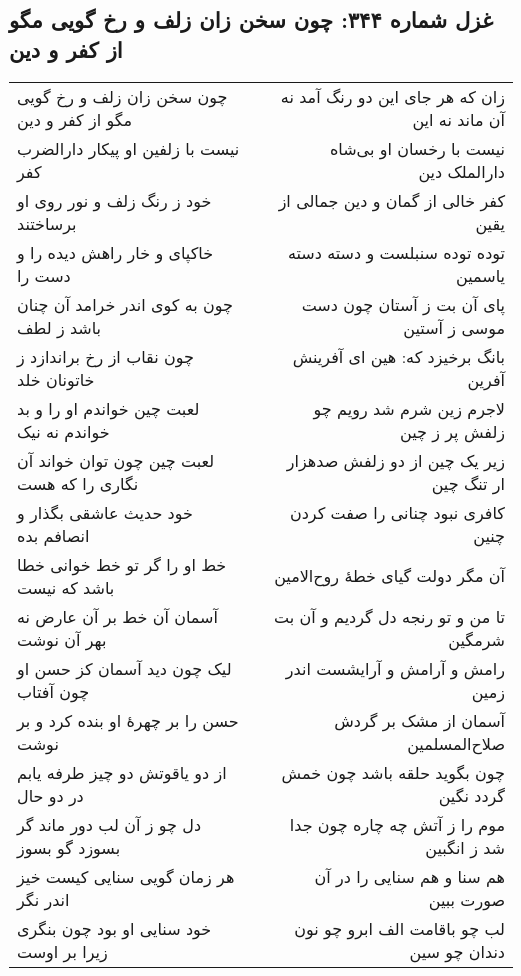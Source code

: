 \begin{center}
\section*{غزل شماره ۳۴۴: چون سخن زان زلف و رخ گویی مگو از کفر و دین}
\label{sec:344}
\begin{longtable}{l p{0.5cm} r}
چون سخن زان زلف و رخ گویی مگو از کفر و دین
&&
زان که هر جای این دو رنگ آمد نه آن ماند نه این
\\
نیست با زلفین او پیکار دارالضرب کفر
&&
نیست با رخسان او بی‌شاه دارالملک دین
\\
خود ز رنگ زلف و نور روی او برساختند
&&
کفر خالی از گمان و دین جمالی از یقین
\\
خاکپای و خار راهش دیده را و دست را
&&
توده توده سنبلست و دسته دسته یاسمین
\\
چون به کوی اندر خرامد آن چنان باشد ز لطف
&&
پای آن بت ز آستان چون دست موسی ز آستین
\\
چون نقاب از رخ براندازد ز خاتونان خلد
&&
بانگ برخیزد که: هین ای آفرینش آفرین
\\
لعبت چین خواندم او را و بد خواندم نه نیک
&&
لاجرم زین شرم شد رویم چو زلفش پر ز چین
\\
لعبت چین چون توان خواند آن نگاری را که هست
&&
زیر یک چین از دو زلفش صدهزار ار تنگ چین
\\
خود حدیث عاشقی بگذار و انصافم بده
&&
کافری نبود چنانی را صفت کردن چنین
\\
خط او را گر تو خط خوانی خطا باشد که نیست
&&
آن مگر دولت گیای خطهٔ روح‌الامین
\\
آسمان آن خط بر آن عارض نه بهر آن نوشت
&&
تا من و تو رنجه دل گردیم و آن بت شرمگین
\\
لیک چون دید آسمان کز حسن او چون آفتاب
&&
رامش و آرامش و آرایشست اندر زمین
\\
حسن را بر چهرهٔ او بنده کرد و بر نوشت
&&
آسمان از مشک بر گردش صلاح‌المسلمین
\\
از دو یاقوتش دو چیز طرفه یابم در دو حال
&&
چون بگوید حلقه باشد چون خمش گردد نگین
\\
دل چو ز آن لب دور ماند گر بسوزد گو بسوز
&&
موم را ز آتش چه چاره چون جدا شد ز انگبین
\\
هر زمان گویی سنایی کیست خیز اندر نگر
&&
هم سنا و هم سنایی را در آن صورت ببین
\\
خود سنایی او بود چون بنگری زیرا بر اوست
&&
لب چو باقامت الف ابرو چو نون دندان چو سین
\\
\end{longtable}
\end{center}
